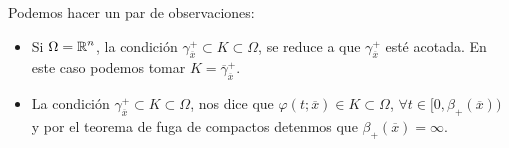 \begin{observation}
Podemos hacer un par de observaciones:
\begin{itemize}
\item Si $\displaystyle \Omega=\mathbb{R}^{n} $, la condición $\displaystyle \gamma^{+}_{\overline{x}}\subset K\subset \Omega  $, se reduce a que $\displaystyle \gamma^{+}_{\overline{x}} $ esté acotada. En este caso podemos tomar $\displaystyle K = \overline{\gamma} ^{+}_{\overline{x}}$.
\item La condición $\displaystyle \gamma^{+}_{\overline{x}}\subset K\subset \Omega  $, nos dice que $\displaystyle \varphi\left(t; \overline{x}\right)\in K\subset \Omega  $, $\displaystyle \forall t \in [0, \beta_{+}\left(\overline{x}\right)) $ y por el teorema de fuga de compactos detenmos que $\displaystyle \beta_{+ }\left(\overline{x}\right)= \infty $.
\end{itemize}
\end{observation}

